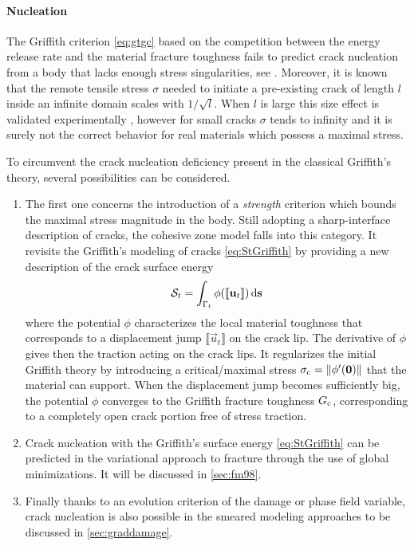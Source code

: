 \paragraph{Nucleation} The Griffith criterion \eqref{eq:gtgc} based on the competition between the energy release rate and the material fracture toughness fails to predict crack nucleation from a body that lacks enough stress singularities, see \cite{Marigo:2010}. Moreover, it is known that the remote tensile stress $\sigma$ needed to initiate a pre-existing crack of length $l$ inside an infinite domain scales with $1/\sqrt{l}$. When $l$ is large this size effect is validated experimentally \cite{Griffith:1921}, however for small cracks $\sigma$ tends to infinity and it is surely not the correct behavior for real materials which possess a maximal stress.

To circumvent the crack nucleation deficiency present in the classical Griffith's theory, several possibilities can be considered.
\begin{enumerate}
\item The first one concerns the introduction of a \emph{strength} criterion which bounds the maximal stress magnitude in the body. Still adopting a sharp-interface description of cracks, the cohesive zone model \cite{Barenblatt:1962,ElicesGuineaGomezPlanas:2002} falls into this category. It revisits the Griffith's modeling of cracks \eqref{eq:StGriffith} by providing a new description of the crack surface energy
\begin{equation} \label{eq:cohesiveSt}
\mathcal{S}_t=\int_{\Gamma_t}\phi(\llbracket\vec{u}_t\rrbracket)\ds
\end{equation}
where the potential $\phi$ characterizes the local material toughness that corresponds to a displacement jump $\llbracket\vec{u}_t\rrbracket$ on the crack lip. The derivative of $\phi$ gives then the traction acting on the crack lips. It regularizes the initial Griffith theory by introducing a critical/maximal stress $\sigma_\mc=\norm{\phi'(\vec{0})}$ that the material can support. When the displacement jump becomes sufficiently big, the potential $\phi$ converges to the Griffith fracture toughness $G_\mathrm{c}$, corresponding to a completely open crack  portion free of stress traction.

\item Crack nucleation with the Griffith's surface energy \eqref{eq:StGriffith} can be predicted in the variational approach to fracture through the use of global minimizations. It will be discussed in \cref{sec:fm98}.

\item Finally thanks to an evolution criterion of the damage or phase field variable, crack nucleation is also possible in the smeared modeling approaches to be discussed in \cref{sec:graddamage}.
\end{enumerate}

